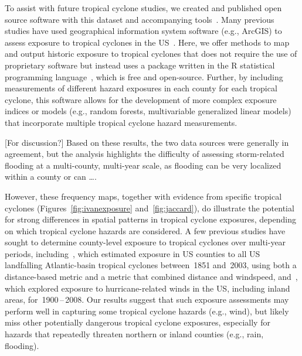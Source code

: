 To assist with future tropical cyclone studies, we created and published open
source software with this dataset and accompanying
tools~\parencite{hurricaneexposuredata, hurricaneexposure}.  Many previous
studies have used geographical information system software (e.g., ArcGIS) to
assess exposure to tropical cyclones in the \ac{US}~\parencite{grabich2016,
zandbergen2009, czajkowski2011, kruk2010}.  Here, we offer methods to map and
output historic exposure to tropical cyclones that does not require the use of
proprietary software but instead uses a package written in the R statistical
programming language~\parencite{R}, which is free and open-source.  Further, by
including measurements of different hazard exposures in each county for each
tropical cyclone, this software allows for the development of more complex
exposure indices or models (e.g., random forests, multivariable generalized
linear models) that incorporate multiple tropical cyclone hazard measurements.  

[For discussion?] Based on these results, the two data sources were generally
in agreement, but the analysis highlights the difficulty of assessing
storm-related flooding at a multi-county, multi-year scale, as flooding can be
very localized within a county or can \ldots .   

However, these frequency maps, together with evidence from
specific tropical cyclones (Figures~\ref{fig:ivanexposure}
and~\ref{fig:jaccard}),  do illustrate the potential for strong differences in
spatial patterns in tropical cyclone exposures, depending on which tropical
cyclone hazards are considered.  A few previous studies have sought to
determine county-level exposure to tropical cyclones over multi-year periods,
including~\textcite{zandbergen2009}, which estimated exposure in \ac{US}
counties to all \ac{US} landfalling Atlantic-basin tropical cyclones
between~1851 and~2003, using both a distance-based metric and a metric that
combined distance and windspeed, and~\textcite{kruk2010}, which explored
exposure to hurricane-related winds in the \ac{US}, including inland areas,
for~1900\,--\,2008.  Our results suggest that such exposure assessments may
perform well in capturing some tropical cyclone hazards (e.g., wind), but
likely miss other potentially dangerous tropical cyclone exposures, especially
for hazards that repeatedly threaten northern or inland counties (e.g., rain,
flooding).

